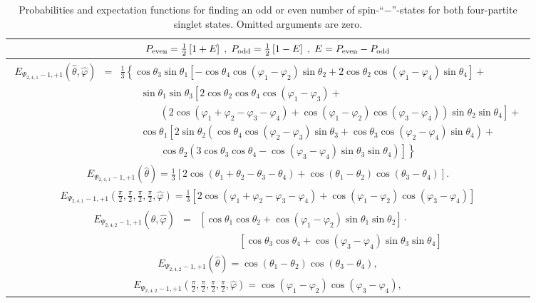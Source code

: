 \documentclass[pra,amsfonts,showpacs,showkeys,preprint]{revtex4}
\begin{document}
\begin{table}
\begin{tabular}{c}
\hline\hline
$
P_{ \rm even} =
{1\over2}\left[1 + E  \right]
\; ,\;
P_{\rm odd} =
{1\over2}\left[1 - E  \right]
\; ,\;
E=
P_{{\rm even}}
-
P_{{\rm odd}}
$
\\
\hline
$
\begin{array}{lll}
E_{{\Psi_{2,4,1}}-1,+1} ({\hat \theta} ,{\hat \varphi})  &=&
\frac{1}{3}
\left\{
\cos \theta_3 \sin \theta_1
\left[
-\cos \theta_4 \cos (\varphi_1 - \varphi_2) \sin \theta_2 +
          2 \cos \theta_2 \cos (\varphi_1 - \varphi_4) \sin \theta_4
\right] +
\right.
\\
&&\qquad
    \sin \theta_1 \sin \theta_3
\left[2 \cos \theta_2 \cos \theta_4 \cos (\varphi_1 - \varphi_3)  +
\right.
\\
&&\qquad
\qquad
\left.
\left(
2 \cos (\varphi_1 + \varphi_2 - \varphi_3 - \varphi_4) +
                \cos (\varphi_1 - \varphi_2)
                \cos (\varphi_3 - \varphi_4)
\right) \sin \theta_2 \sin \theta_4
\right]   +
\\
&&\qquad
    \cos \theta_1
\left[
2 \sin \theta_2
\left(
\cos \theta_4 \cos (\varphi_2 - \varphi_3) \sin \theta_3 +
                \cos \theta_3 \cos (\varphi_2 - \varphi_4) \sin \theta_4
\right) \right.
 +
\\
&&\qquad
\qquad
\left.
\left.
\cos \theta_2
\left(3 \cos \theta_3 \cos \theta_4 -
                \cos (\varphi_3 - \varphi_4) \sin \theta_3
\sin \theta_4
\right)
\right]
\right\}
\end{array}
$
\\
$E_{{\Psi_{2,4,1}}-1,+1} ({\hat \theta} )  =
\frac{1}{3} \left[2 \cos (\theta_1 +\theta_2 -\theta_3 -\theta_4 )+\cos
   (\theta_1 -\theta_2 ) \cos (\theta_3 -\theta_4 )\right].
$
\\
$
E_{{\Psi_{2,4,1}}-1,+1} ( \frac{\pi}{2},\frac{\pi}{2},\frac{\pi}{2},\frac{\pi}{2},\hat \varphi )=
\frac{1}{3} \left[2 \cos (\varphi_1+\varphi_2- \varphi_3 - \varphi_4)
+\cos (\varphi_1-\varphi_2) \cos (\varphi_3-\varphi_4)
\right]
$ \\
\hline
$
\begin{array}{lll}
E_{{\Psi_{2,4,2}}-1,+1}({\hat \theta} , {\hat \varphi } )  &=&
\left[\cos \theta_1 \cos \theta_2 +
          \cos ( \varphi_1 - \varphi_2) \sin \theta_1 \sin \theta_2\right]\cdot \\
&&\qquad  \qquad  \left[\cos \theta_3 \cos \theta_4 +
          \cos (\varphi_3 - \varphi_4) \sin \theta_3 \sin \theta_4
\right]
\end{array}
$
\\
$E_{{\Psi_{2,4,2}}-1,+1}({\hat \theta} )  =
\cos (\theta_1 -\theta_2 ) \cos (\theta_3 -\theta_4 ),
$
\\
$E_{{\Psi_{2,4,2}}-1,+1}( \frac{\pi}{2},\frac{\pi}{2},\frac{\pi}{2},\frac{\pi}{2},{\hat \varphi} )  =
\cos (\varphi_1 -\varphi_2 ) \cos (\varphi_3 -\varphi_4 ),
$
\\
\hline\hline
\end{tabular}
\caption{Probabilities and expectation functions
for finding an odd or even number of spin-``$-$''-states for both four-partite singlet states.
Omitted arguments are zero.
\label{2008-gtq-2part}
}
\end{table}




\end{document}

